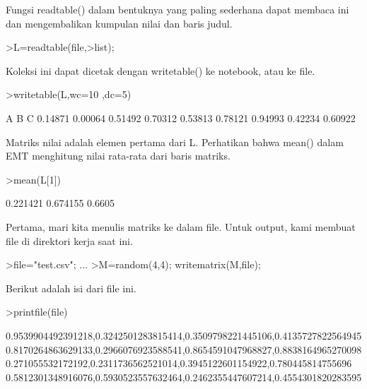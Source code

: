 \documentclass{article}
\begin{document}
\begin{eulernotebook}
\begin{eulercomment}
\begin{eulercomment}
\begin{euleroutput}
\end{euleroutput}
\begin{eulercomment}
Fungsi readtable() dalam bentuknya yang paling sederhana dapat membaca
ini dan mengembalikan kumpulan nilai dan baris judul.
\end{eulercomment}
\begin{eulerprompt}
>L=readtable(file,>list);
\end{eulerprompt}
\begin{eulercomment}
Koleksi ini dapat dicetak dengan writetable() ke notebook, atau ke
file.
\end{eulercomment}
\begin{eulerprompt}
>writetable(L,wc=10 ,dc=5)
\end{eulerprompt}
\begin{euleroutput}
           A         B         C
     0.14871   0.00064   0.51492
     0.70312   0.53813   0.78121
     0.94993   0.42234   0.60922
\end{euleroutput}
\begin{eulercomment}
Matriks nilai adalah elemen pertama dari L. Perhatikan bahwa mean()
dalam EMT menghitung nilai rata-rata dari baris matriks.
\end{eulercomment}
\begin{eulerprompt}
>mean(L[1])
\end{eulerprompt}
\begin{euleroutput}
       0.221421 
       0.674155 
         0.6605 
\end{euleroutput}
\begin{eulercomment}
Pertama, mari kita menulis matriks ke dalam file. Untuk output, kami
membuat file di direktori kerja saat ini.
\end{eulercomment}
\begin{eulerprompt}
>file="test.csv"; ...
>M=random(4,4); writematrix(M,file);
\end{eulerprompt}
\begin{eulercomment}
Berikut adalah isi dari file ini.
\end{eulercomment}
\begin{eulerprompt}
>printfile(file)
\end{eulerprompt}
\begin{euleroutput}
  0.9539904492391218,0.3242501283815414,0.3509798221445106,0.4135727822564945
  0.8170264863629133,0.2966076923588541,0.8654591047968827,0.8838164965270098
  0.271055532172192,0.2311736562521014,0.3945122601154922,0.780445814755696
  0.5812301348916076,0.5930523557632464,0.2462355447607214,0.4554301820283595
  

\end{euleroutput}
\end{eulercomment}
\end{eulercomment}
\end{eulernotebook}
\end{document}
